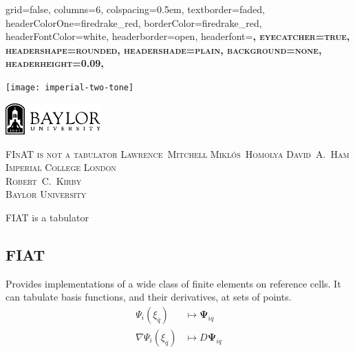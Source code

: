 \documentclass[cmyk,luatex,a0paper,portrait]{baposter}
\begin{document}
\begin{poster}{
    grid=false,
    columns=6,
    colspacing=0.5em,
    textborder=faded,
    headerColorOne=firedrake_red,
    borderColor=firedrake_red,
    headerFontColor=white,
    headerborder=open,
    headerfont=\bfseries\Large\scshape,
    eyecatcher=true,
    headershape=rounded,
    headershade=plain,
    background=none,
    headerheight=0.09\textheight,
  }
  {
    \begin{minipage}[l]{0.3\textwidth}
      \texttt{[image: imperial-two-tone]}
      \par
      \vspace{0.2cm}
      \includegraphics[align=t, height=1.2cm]{baylor-logo-bw}
    \end{minipage}
  } 
  {\scshape\LARGE FInAT is not a tabulator}
  {\vspace{0.2em}\small\scshape Lawrence~Mitchell\quad
    Mikl\'os~Homolya \quad David~A.~Ham\\[0.15em]Imperial College London
    \\[0.5em]  
    Robert~C.~Kirby\\[0.15em]Baylor University}
  {
  }

  \begin{posterbox}[name=introduction,span=6,column=0,row=0]{FIAT is a
      tabulator}
    \begin{minipage}[t]{0.49\textwidth}%
      \subsection*{FIAT}
      \vspace{-0.25\baselineskip}
      \raggedright
      Provides implementations of a wide class of finite elements on
      reference cells. It can tabulate basis functions, and their
      derivatives, at sets of points.  \vspace{-1\baselineskip}
      \begin{align*}
        \Psi_i(\xi_q) &\mapsto \mathbf{\Psi}_{iq}\\
        \nabla\Psi_i(\xi_q) &\mapsto D\mathbf{\Psi}_{iq}
      \end{align*}
    \end{minipage}%
    \hspace{0.02\textwidth}%
    \begin{minipage}[t]{0.49\textwidth}%
      \raggedright

\end{minipage}
\end{posterbox}
\end{poster}
\end{document}
